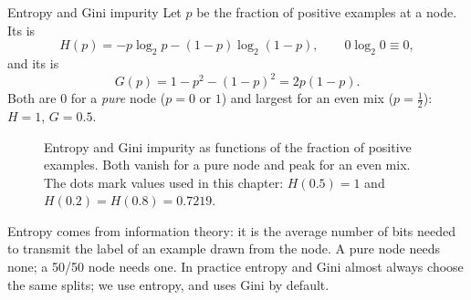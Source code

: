 \begin{defbox}{Entropy and Gini impurity}
Let $p$ be the fraction of positive examples at a node. Its  is
\[
  H(p) = -p\log_2 p - (1-p)\log_2(1-p), \qquad 0\log_2 0 \equiv 0,
\]
and its  is
\[
  G(p) = 1 - p^2 - (1-p)^2 = 2p(1-p) .
\]
Both are $0$ for a \emph{pure} node ($p = 0$ or $1$) and largest for an even mix
($p = \tfrac12$): $H = 1$, $G = 0.5$.
\end{defbox}

\begin{figure}[htbp]
  \centering
  \caption{Entropy and Gini impurity as functions of the fraction of positive
  examples. Both vanish for a pure node and peak for an even mix. The dots mark
  values used in this chapter: $H(0.5) = 1$ and $H(0.2) = H(0.8) = 0.7219$.}
  \label{fig:impurity}
\end{figure}

Entropy comes from information theory: it is the average number of bits needed
to transmit the label of an example drawn from the node. A pure node needs none;
a 50/50 node needs one. In practice entropy and Gini almost always choose the
same splits; we use entropy, and  uses Gini by default.

